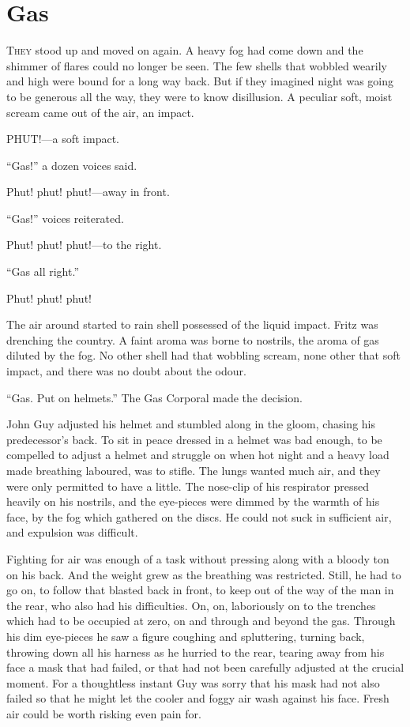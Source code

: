 \chapter*{\textsf{Gas}}

T\textsc{hey} stood up and moved on again. A heavy fog had come down and the shimmer of flares could no longer be seen. The few shells that wobbled wearily and high were bound for a long way back. But if they imagined night was going to be generous all the way, they were to know disillusion. A peculiar soft, moist scream came out of the air, an impact.

PHUT!---a soft impact.

``Gas!'' a dozen voices said.

Phut! phut! phut!---away in front.

``Gas!'' voices reiterated.

Phut! phut! phut!---to the right.

``Gas all right.''

Phut! phut! phut!

The air around started to rain shell possessed of the liquid impact. Fritz was drenching the country. A faint aroma was borne to nostrils, the aroma of gas diluted by the fog. No other shell had that wobbling scream, none other that soft impact, and there was no doubt about the odour.

``Gas. Put on helmets.'' The Gas Corporal made the decision.

John Guy adjusted his helmet and stumbled along in the gloom, chasing his predecessor's back. To sit in peace dressed in a helmet was bad enough, to be compelled to adjust a helmet and struggle on when hot night and a heavy load made breathing laboured, was to stifle. The lungs wanted much air, and they were only permitted to have a little. The nose-clip of his respirator pressed heavily on his nostrils, and the eye-pieces were dimmed by the warmth of his face, by the fog which gathered on the discs. He could not suck in sufficient air, and expulsion was difficult.

Fighting for air was enough of a task without pressing along with a bloody ton on his back. And the weight grew as the breathing was restricted. Still, he had to go on, to follow that blasted back in front, to keep out of the way of the man in the rear, who also had his difficulties. On, on, laboriously on to the trenches which had to be occupied at zero, on and through and beyond the gas. Through his dim eye-pieces he saw a figure coughing and spluttering, turning back, throwing down all his harness as he hurried to the rear, tearing away from his face a mask that had failed, or that had not been carefully adjusted at the crucial moment. For a thoughtless instant Guy was sorry that his mask had not also failed so that he might let the cooler and foggy air wash against his face. Fresh air could be worth risking even pain for.

